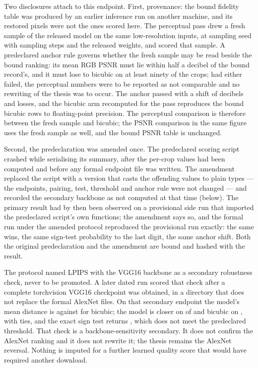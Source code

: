 Two disclosures attach to this endpoint. First, provenance: the bound fidelity
table was produced by an earlier inference run on another machine, and its
restored pixels were not the ones scored here. The perceptual pass drew a fresh
sample of the released model on the same \SubsetN{} low-resolution inputs, at
sampling seed \LpipsSeed{} with \LpipsSteps{} sampling steps and the released
weights, and scored that sample. A predeclared anchor rule governs whether the
fresh sample may be read beside the bound ranking: its mean RGB PSNR must lie
within half a decibel of the bound record's, and it must lose to bicubic on at
least ninety of the \SubsetN{} crops; had either failed, the perceptual numbers
were to be reported as not comparable and no rewriting of the thesis was to
occur. The anchor passed with a shift of \AnchorDeltaDb{} decibels and
\AnchorLosses{} losses, and the bicubic arm recomputed for the pass reproduces
the bound bicubic rows to floating-point precision. The perceptual comparison
is therefore between the fresh sample and bicubic; the PSNR comparison in the
same figure uses the fresh sample as well, and the bound PSNR table is unchanged.

Second, the predeclaration was amended once. The predeclared scoring script
crashed while serialising its summary, after the per-crop values had been
computed and before any formal endpoint file was written. The amendment
replaced the script with a version that casts the offending values to plain
types --- the endpoints, pairing, test, threshold and anchor rule were not
changed --- and recorded the secondary backbone as not computed at that time
(below). The
primary result had by then been observed on a provisional side run that
imported the predeclared script's own functions; the amendment says so, and the
formal run under the amended protocol reproduced the provisional run exactly:
the same \LpipsWins{} wins, the same sign-test probability to the last digit,
the same anchor shift. Both the original predeclaration and the amendment are
bound and hashed with the result.

The protocol named LPIPS with the VGG16 backbone as a secondary robustness
check, never to be promoted. A later dated run scored that check after a
complete torchvision VGG16 checkpoint was obtained, in a directory that does
not replace the formal AlexNet files. On that secondary endpoint the model's
mean distance is \LpipsVggDit{} against \LpipsVggBicubic{} for bicubic; the
model is closer on \LpipsVggWins{} of \SubsetN{} and bicubic on
\LpipsVggLosses{}, with \LpipsVggTies{} ties, and the exact sign test returns
\LpipsVggSignP{}, which does not meet the predeclared threshold. That check
is a backbone-sensitivity secondary. It does not confirm the AlexNet ranking
and it does not rewrite it; the thesis remains the AlexNet reversal. Nothing
is imputed for a further learned quality score that would have required
another download.

